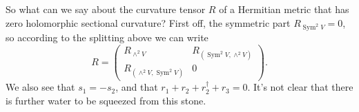 \documentclass[10pt,a4paper]{amsart}
\theoremstyle{definition}
\DeclareMathOperator{\Sym}{Sym}
\begin{document}
So what can we say about the curvature tensor $R$ of a Hermitian metric that has
zero holomorphic sectional curvature?
First off, the symmetric part $R_{\Sym^2 V} = 0$, so according to the splitting
above we can write
$$
R = \begin{pmatrix}
R_{\wedge^2 V} & R_{(\Sym^2V, \wedge^2 V)}
\\
R_{(\wedge^2 V, \Sym^2V)} & 0
\end{pmatrix}.
$$
We also see that $s_1 = -s_2$, and that $r_1 + r_2 + r_2^\dagger + r_3 = 0$.
It's not clear that there is further water to be squeezed from this stone.




\end{document}
